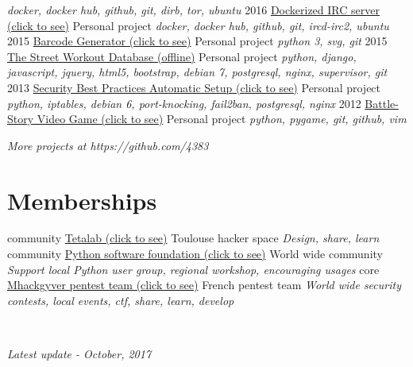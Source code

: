 \documentclass[]{friggeri-cv}
\begin{document}
\begin{entrylist}
        {\emph{docker, docker hub, github, git, dirb, tor, ubuntu}}
    \entry
        {2016}
        {\href{https://hub.docker.com/r/4383/irc-server}{Dockerized IRC server (click to see)}}
        {Personal project}
        {\emph{docker, docker hub, github, git, ircd-irc2, ubuntu}}
    \entry
        {2015}
        {\href{http://pypi.python.org/pypi/barcode-generator/0.1rc15}{Barcode Generator (click to see)}}
        {Personal project}
        {\emph{python 3, svg, git}}
    \entry
        {2015}
        {\href{https://github.com/4383/street-workout-database}{The Street Workout Database (offline)}}
        {Personal project}
        {\emph{python, django, javascript, jquery, html5, bootstrap, debian 7, postgresql, nginx, supervisor, git}}
    \entry
        {2013}
        {\href{https://github.com/4383/fabric-debian/}{Security Best Practices Automatic Setup (click to see)}}
        {Personal project}
        {\emph{python, iptables,  debian 6, port-knocking, fail2ban, postgresql, nginx}}
    \entry
        {2012}
        {\href{http://github.com/4383/battle-story/}{Battle-Story Video Game (click to see)}}
        {Personal project}
        {\emph{python, pygame, git, github, vim}}
\end{entrylist}

\begin{flushright}
    \emph{More projects at https://github.com/4383}
\end{flushright}

\section{Memberships}
\begin{entrylist}
    \entry
        {community}
        {\href{https://www.tetalab.org/en}{Tetalab (click to see)}}
        {Toulouse hacker space}
        {\emph{Design, share, learn}}
    \entry
        {community}
        {\href{https://www.python.org/psf/}{Python software foundation (click to see)}}
        {World wide community}
        {\emph{Support local Python user group, regional workshop, encouraging usages}}
    \entry
        {core}
        {\href{https://github.com/mhackgyver-squad/mhackgyver}{Mhackgyver pentest team (click to see)}}
        {French pentest team}
        {\emph{World wide security contests, local events, ctf, share, learn, develop}}
\end{entrylist}

~
\begin{flushright}
    \emph{Latest update - October, 2017}
\end{flushright}
\end{document}
